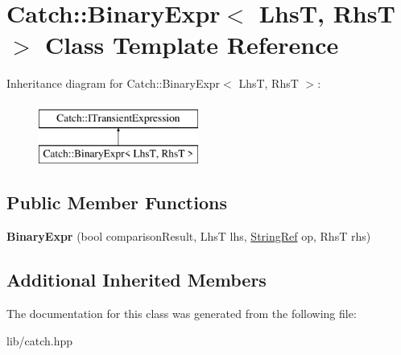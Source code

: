 \hypertarget{class_catch_1_1_binary_expr}{}\section{Catch\+:\+:Binary\+Expr$<$ LhsT, RhsT $>$ Class Template Reference}
\label{class_catch_1_1_binary_expr}
Inheritance diagram for Catch\+:\+:Binary\+Expr$<$ LhsT, RhsT $>$\+:\begin{figure}[H]
\begin{center}
\leavevmode
\includegraphics[height=2.000000cm]{class_catch_1_1_binary_expr}
\end{center}
\end{figure}
\subsection*{Public Member Functions}
\begin{DoxyCompactItemize}
\item 
\mbox{\label{class_catch_1_1_binary_expr_a657d66346aef97a760c22776fe6008b6}} 
{\bfseries Binary\+Expr} (bool comparison\+Result, LhsT lhs, \mbox{\hyperlink{class_catch_1_1_string_ref}{String\+Ref}} op, RhsT rhs)
\end{DoxyCompactItemize}
\subsection*{Additional Inherited Members}


The documentation for this class was generated from the following file\+:\begin{DoxyCompactItemize}
\item 
lib/catch.\+hpp\end{DoxyCompactItemize}
